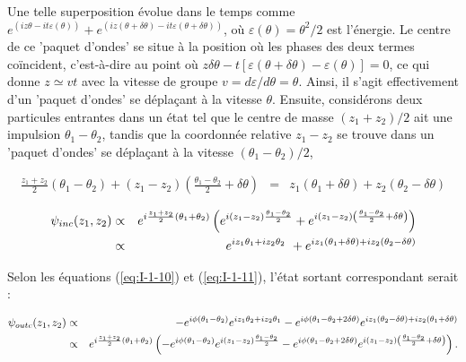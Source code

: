 Une telle superposition évolue dans le temps comme $e^{(iz\theta -it\varepsilon(\theta))} + e^{(iz(\theta + \delta \theta )  -it\varepsilon(\theta + \delta \theta ))}$, où $\varepsilon(\theta) = \theta ^2/2$ est l'énergie. Le centre de ce 'paquet d'ondes' se situe à la position où les phases des deux termes coïncident, c'est-à-dire au point où $z\delta \theta  - t[\varepsilon(\theta + \delta \theta ) - \varepsilon(\theta)] = 0$, ce qui donne $z \simeq vt$ avec la vitesse de groupe $v = d\varepsilon/d\theta = \theta$. Ainsi, il s'agit effectivement d'un 'paquet d'ondes' se déplaçant à la vitesse $\theta$. Ensuite, considérons deux particules entrantes dans un état tel que le centre de masse $(z_1 + z_2)/2$ ait une impulsion $\theta_1 - \theta_2$, tandis que la coordonnée relative $z_1 - z_2$ se trouve dans un 'paquet d'ondes' se déplaçant à la vitesse $(\theta_1 - \theta_2)/2$,

{\color{gray}
\begin{eqnarray*}
	\frac{ z_1 + z_2}{2} ( \theta_1 - \theta_2 ) + ( z_1 - z_2 ) \left ( \frac{ \theta_1 -\theta_2}{2} + \delta \theta  \right ) & = & z_1 ( \theta_1  + \delta \theta ) + z_2 ( \theta_2 - \delta \theta )  
\end{eqnarray*}
}

\begin{eqnarray}
	\psi_{inc} ( z_1 , z_2 ) & \propto & e^{i \frac{ z_1 + z_2 }{2} ( \theta_1 + \theta_2 ) }  \left ( e^{i ( z_1 - z_2 ) \frac{ \theta_1 - \theta_2}{2} } +  e^{i ( z_1 - z_2 )  \left ( \frac{ \theta_1 - \theta_2}{2}+ \delta \theta  \right )  } \right )\notag  \\
	& \propto & e^{ i z_1 \theta_1 + i z_2 \theta_2 } + 	 e^{ i z_1 ( \theta_1 + \delta \theta )  + i z_2  ( \theta_2 - \delta \theta)   }%
\end{eqnarray}

Selon les équations (\ref{eq:I-1-10}) et (\ref{eq:I-1-11}), l'état sortant correspondant serait :

\begin{eqnarray}
	\psi_{outc} ( z_1 , z_2 ) & \propto & - e^{i\phi ( \theta_1 - \theta_2 ) }  e^{ iz_1 \theta_2 + i z_2 \theta_1 }  - e^{i\phi ( \theta_1 - \theta_2 + 2\delta \theta ) }  e^{ iz_1 (\theta_2- \delta \theta )  + i z_2 (\theta_1 + \delta \theta )  } \notag  \\
	& \propto & e^{i \frac{ z_1 + z_2 }{2} ( \theta_1 + \theta_2 ) }  \left ( - e^{ i \phi ( \theta_1 - \theta_2 ) }e^{i(z_1 - z_2 ) \frac{ \theta_1 - \theta_2}{2} } -e^{ i \phi ( \theta_1 - \theta_2 + 2 \delta \theta ) }e^{i(z_1 - z_2 )  \left ( \frac{ \theta_1 - \theta_2}{2} + \delta \theta \right )  }  \right ). %
\end{eqnarray}

